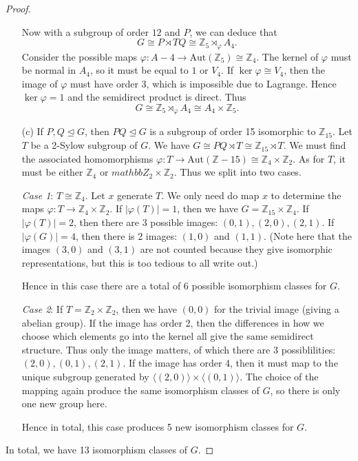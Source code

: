 \documentclass[12pt]{article}
\theoremstyle{remark}
\theoremstyle{named}
\newcommand{\Aut}{\text{Aut}}
\newcommand{\normal}{\trianglelefteq}
\begin{document}
\begin{proof}
\begin{enumerate}
        Now with a subgroup of order \(12\) and \(P\), we can deduce that 
        \[G \cong P \rtimes T Q \cong \mathbb Z_5 \rtimes_{\varphi} A_4.\]
        Consider the possible maps \(\varphi : A-4 \to \Aut(\mathbb Z_5) \cong \mathbb Z_4\). The kernel of \(\varphi\) must be normal in \(A_4\), so it must be equal to \(1\) or \(V_4\). If \(\ker \varphi \cong V_4\), then the image of \(\varphi\) must have order 3, which is impossible due to Lagrange. Hence \(\ker \varphi = 1\) and the semidirect product is direct. Thus 
        \[G \cong \mathbb Z_5 \rtimes_{\varphi} A_4 \cong A_4 \times \mathbb Z_5.\]
         
        \item[(c)] If \(P, Q \normal G\), then \(PQ \normal G\) is a subgroup of order 15 isomorphic to \(\mathbb Z_{15}\). Let \(T\) be a 2-Sylow subgroup of \(G\). We have \(G \cong PQ \rtimes T \cong \mathbb Z_{15} \rtimes T\). We must find the associated homomorphisms \(\varphi : T \to \Aut(\mathbb Z-{15}) \cong \mathbb Z_4 \times \mathbb Z_2\).  
        As for \(T\), it must be either \(\mathbb Z_4\) or \(mathbb Z_2 \times \mathbb Z_2\). Thus we split into two cases.

        \textit{Case 1}: \(T \cong \mathbb Z_4\). Let \(x\) generate \(T\). We only need do map \(x\) to determine the maps \(\varphi : T \to \mathbb Z_4 \times \mathbb Z_2\). If \(|\varphi(T)| = 1\), then we have \(G = \mathbb Z_{15} \times \mathbb Z_4\). If \(|\varphi(T)| = 2\), then there are 3 possible images: \((0, 1), (2, 0), (2, 1)\). If \(|\varphi(G)| = 4\), then there is 2 images: \((1, 0)\) and \((1, 1)\). 
        (Note here that the images \((3, 0)\) and \((3, 1)\) are not counted because they give isomorphic representations, but this is too tedious to all write out.)

        Hence in this case there are a total of 6 possible isomorphism classes for \(G\). 

        \textit{Case 2}: If \(T = \mathbb Z_2 \times \mathbb Z_2\), then we have \((0, 0)\) for the trivial image (giving a abelian group). If the image has order 2, then the differences in how we choose which elements go into the kernel all give the same semidirect structure. Thus only the image matters, of which there are 3 possiblilities: \((2, 0), (0, 1), (2, 1)\). If the image has order 4, then it must map to the unique subgroup generated by \(\langle(2, 0)\rangle \times \langle(0, 1)\rangle\). 
        The choice of the mapping again produce the same isomorphism classes of \(G\), so there is only one new group here. 

        Hence in total, this case produces 5 new isomorphism classes for \(G\). 
    \end{enumerate}

    In total, we have 13 isomorphism classes of \(G\).
\end{proof}
\end{document}
